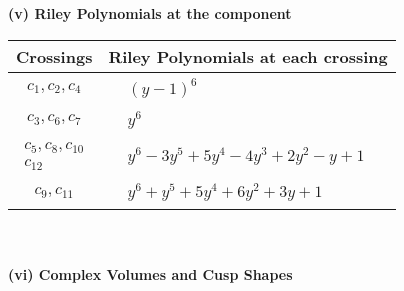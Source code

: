 \documentclass[1p]{elsarticle_modified}
\theoremstyle{definition}
\begin{document}
\newpage\renewcommand{\arraystretch}{1}
\flushleft \textbf{(v) Riley Polynomials at the component}\newline \\
\begin{tabular}{m{50pt}|m{274pt}}
Crossings & \hspace{64pt}Riley Polynomials at each crossing \\
\hline $$\begin{aligned}c_{1},c_{2},c_{4}\end{aligned}$$&$\begin{aligned}
&(y-1)^6
\end{aligned}$\\
\hline $$\begin{aligned}c_{3},c_{6},c_{7}\end{aligned}$$&$\begin{aligned}
&y^6
\end{aligned}$\\
\hline $$\begin{aligned}c_{5},c_{8},c_{10}\\c_{12}\end{aligned}$$&$\begin{aligned}
&y^6-3 y^5+5 y^4-4 y^3+2 y^2- y+1
\end{aligned}$\\
\hline $$\begin{aligned}c_{9},c_{11}\end{aligned}$$&$\begin{aligned}
&y^6+y^5+5 y^4+6 y^2+3 y+1
\end{aligned}$\\
\hline
\end{tabular}\\~\\
\newpage\flushleft \textbf{(vi) Complex Volumes and Cusp Shapes}
\end{document}
